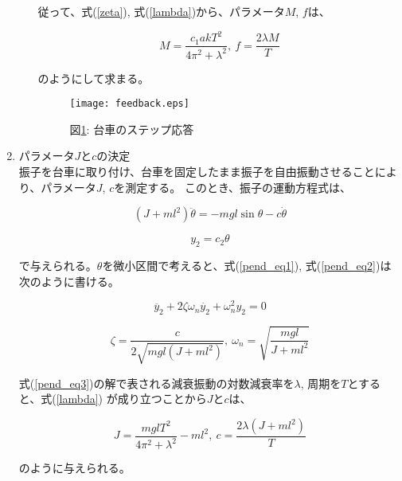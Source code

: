 \documentclass[a4j,11pt,twoside]{jbook}
\begin{document}
\begin{enumerate}
\begin{itemize}
        従って、式(\ref{zeta}), 式(\ref{lambda})から、パラメータ$M$, $f$は、

        \begin{equation}
            M = \frac{c_{1}akT^2}{4\pi^2 + \lambda^2},\
            f = \frac{2\lambda M}{T}
        \end{equation}

        のようにして求まる。

        \begin{figure}[htbp]
            \begin{center}
                \texttt{[image: feedback.eps]}
                \caption{図\ref{feedback}: 台車のステップ応答}
                \label{feedback}
            \end{center}
        \end{figure}

    \end{itemize}

    \item パラメータ$J$と$c$の決定 \\
    \quad 振子を台車に取り付け、台車を固定したまま振子を自由振動させることにより、パラメータ$J$, $c$を測定する。
    このとき、振子の運動方程式は、

    \begin{equation}
        (J + ml^2) \ddot{\theta} = -mgl\sin{\theta} - c \dot{\theta}
        \label{pend_eq1}
    \end{equation}

    \begin{equation}
        y_{2} = c_{2} \theta
        \label{pend_eq2}
    \end{equation}

    で与えられる。$\theta$を微小区間で考えると、式(\ref{pend_eq1}), 式(\ref{pend_eq2})は次のように書ける。

    \begin{equation}
        \ddot{y_2} + 2\zeta \omega_{n} \dot{y_{2}} + \omega_{n}^2y_{2} = 0
        \label{pend_eq3}
    \end{equation}

    \begin{equation}
        \zeta = \frac{c}{2\sqrt{mgl(J + ml^2)}},\
        \omega_{n} = \sqrt{\frac{mgl}{J + ml^2}}
    \end{equation}

    式(\ref{pend_eq3})の解で表される減衰振動の対数減衰率を$\lambda$, 周期を$T$とすると、式(\ref{lambda})
    が成り立つことから$J$と$c$は、

    \begin{equation}
        J = \frac{mglT^2}{4\pi^2 + \lambda^2} - ml^2,\
        c = \frac{2\lambda (J + ml^2)}{T}
    \end{equation}

    のように与えられる。


\end{enumerate}
\end{document}
